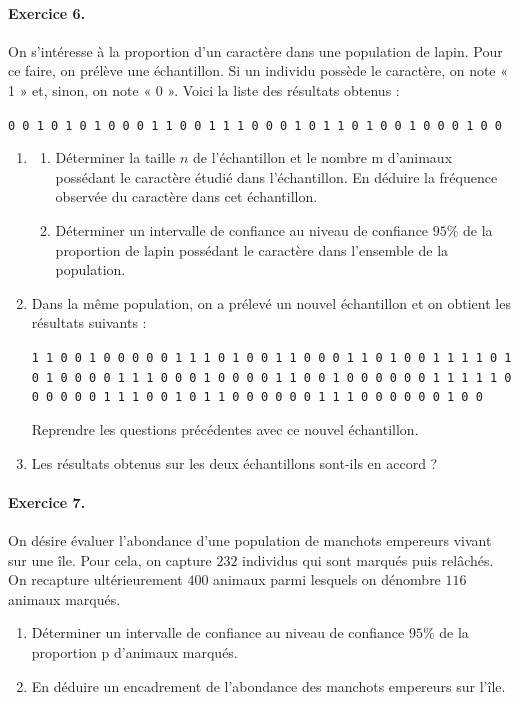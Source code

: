 \documentclass[11pt]{article}
\begin{document}
\paragraph{Exercice 6.} On s’intéresse à la proportion d’un caractère dans une population de lapin. Pour
ce faire, on prélève une échantillon. Si un individu possède le caractère, on note « 1 » et, sinon,
on note « 0 ».
Voici la liste des résultats obtenus :
\begin{center}
\texttt{0 0 1 0 1 0 1 0 0 0 1 1 0 0 1 1 1 0 0 0 1 0 1 1 0 1 0 0 1 0 0 0 1 0 0}
\end{center}
\begin{enumerate}
  \item \begin{enumerate}
      \item Déterminer la taille $n$ de l’échantillon et le nombre m d’animaux possédant le caractère
étudié dans l’échantillon. En déduire la fréquence observée du caractère dans cet
échantillon.
\item Déterminer un intervalle de confiance au niveau de confiance $95\%$ de la proportion de
lapin possédant le caractère dans l’ensemble de la population.
    \end{enumerate}
  \item Dans la même population, on a prélevé un nouvel échantillon et on obtient les résultats
suivants :
\begin{center}
\texttt{1 1 0 0 1 0 0 0 0 0 1 1 1 0 1 0 0 1 1 0 0 0 1 1 0 1 0 0 1 1 1 1 0 1 0 1 0 0 0 0 1 1 1 0 0 0 1 0 0 0 0 1 1 0 0 1 0 0 0 0 0 0 1 1 1 1 1 0 0 0 0 0 0 1 1 1 0 0 1 0 1 1 0 0 0 0 0 0 1 1 1 0 0 0 0 0 0 1 0 0}
\end{center}
Reprendre les questions précédentes avec ce nouvel échantillon.
\item Les résultats obtenus sur les deux échantillons sont-ils en accord ?
\end{enumerate}

\paragraph{Exercice 7.} On désire évaluer l’abondance d’une population de manchots empereurs vivant
sur une île. Pour cela, on capture $232$ individus qui sont marqués puis relâchés. On recapture
ultérieurement $400$ animaux parmi lesquels on dénombre $116$ animaux marqués.
\begin{enumerate}
  \item Déterminer un intervalle de confiance au niveau de confiance $95\%$ de la proportion p
d’animaux marqués.
\item En déduire un encadrement de l’abondance des manchots empereurs sur l’île.
\end{enumerate}
\end{document}
